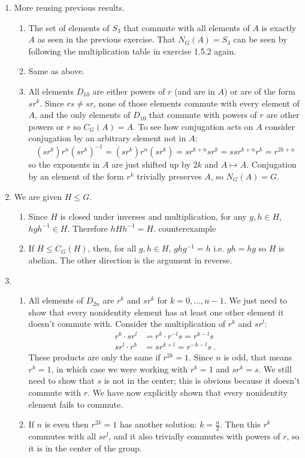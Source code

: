 \documentclass[]{article}
\begin{document}
\begin{enumerate}
\item More reusing previous results. 
\begin{enumerate}
\item The set of elements of $S_3$ that commute with all elements of $A$ is exactly $A$ as seen in the previous exercise. That $N_G(A) = S_3$ can be seen by following the multiplication table in exercise 1.5.2 again.
\item Same as above.
\item All elements $D_{10}$ are either powers of $r$ (and are in $A$) or are of the form $sr^k$. Since $rs \neq sr$, none of those elements commute with every element of $A$, and the only elements of $D_{10}$ that commute with powers of $r$ are other powers or $r$ so $C_G(A) = A$. To see how conjugation acts on $A$ consider conjugation by an arbitrary element not in $A$:
\begin{equation}
(sr^k)r^n(sr^k)^{-1} = (sr^k)r^n(sr^k) = sr^{k+n}sr^k = ssr^{k+n}r^k = r^{2k+n}
\end{equation}
so the exponents in $A$ are just shifted up by $2k$ and $A \mapsto A$. Conjugation by an element of the form $r^k$ trivially preserves $A$, so $N_G(A) = G$.
\end{enumerate}


\item We are given $H \leq G$.
\begin{enumerate}
\item Since $H$ is closed under inverses and multiplication, for any $g,h \in H$, $hgh^{-1} \in H$. Therefore $hHh^{-1} = H$. {\color{red} counterexample}
\item If $H \leq C_G(H)$, then, for all $g,h \in H$, $ghg^{-1} = h$ i.e. $gh = hg$ so $H$ is abelian. The other direction is the argument in reverse.
\end{enumerate}


\item 
\begin{enumerate}
\item All elements of $D_{2n}$ are $r^k$ and $sr^k$ for $k=0,\ldots,n-1$. We just need to show that every nonidentity element has at least one other element it doesn't commute with. Consider the multiplication of $r^k$ and $sr^l$:
\begin{align}
r^k \cdot sr^l &= r^k \cdot r^{-l}s = r^{k-l}s \\
sr^l \cdot r^k &= sr^{k+l} = r^{-k-l}s\ .
\end{align}
These products are only the same if $r^{2k} = 1$. Since $n$ is odd, that means $r^k = 1$, in which case we were working with $r^k = 1$ and $sr^k = s$. We still need to show that $s$ is not in the center; this is obvious because it doesn't commute with $r$. We have now explicitly shown that every nonidentity element fails to commute.
\item If $n$ is even then $r^{2k} = 1$ has another solution: $k = \frac{n}{2}$. Then this $r^k$ commutes with all $sr^l$, and it also trivially commutes with powers of $r$, so it is in the center of the group.
\end{enumerate}



\end{enumerate}
\end{document}
